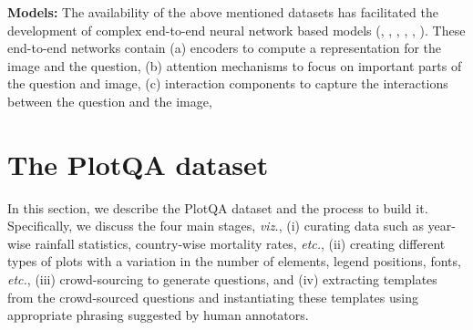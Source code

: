 \documentclass[10pt,twocolumn,letterpaper]{article}
\begin{document}
\noindent \textbf{Models:}
The availability of the above mentioned datasets has facilitated the development of complex end-to-end neural network based models (\cite{SAN}, \cite{LuYBP16}, \cite{YangHGDS16}, \cite{NohH16}, \cite{SantoroRBMPBL17}, ).
These end-to-end networks contain (a) encoders to compute a representation for the image and the question, (b) attention mechanisms to focus on important parts of the question and image, (c) interaction components to capture the interactions between the question and the image, 
\section{The PlotQA dataset}

In this section, we describe the PlotQA dataset and the process to build it. 
Specifically, we discuss the four main stages, \textit{viz.}, (i) curating data such as year-wise rainfall statistics, country-wise mortality rates, \textit{etc.}, (ii) creating different types of plots with a variation in the number of elements, legend positions, fonts, \textit{etc.}, (iii) crowd-sourcing to generate questions, and (iv) extracting templates from the crowd-sourced questions and instantiating these templates using appropriate phrasing suggested by human annotators.
\end{document}
